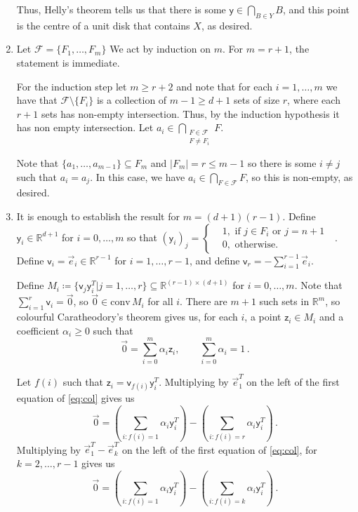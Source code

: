 \documentclass[kulak]{tplt}
\theoremstyle{definition}
\newcommand{\R}{\mathbb{R}}
\newcommand{\FF}{\mathcal F}
\newcommand{\vv}{\mathsf{v}}
\newcommand{\vy}{\mathsf{y}}
\newcommand{\vz}{\mathsf{z}}
\newcommand{\conv}{\mathrm{conv}}
\begin{document}
\begin{enumerate}
Thus, Helly's theorem tells us that there is some $\vy \in \bigcap_{B \in Y} B $, and this point is the centre of a unit disk that contains $X$, as desired.


\item 
Let $\FF = \{F_1, \ldots, F_m\} $
We act by induction on $m$.
For $m = r+1$, the statement is immediate.

For the induction step let $m \geq r+2$ and note that for each $i = 1, \ldots, m$ we have that $\FF \setminus  \{ F_i\} $ is a collection of $m-1\geq d+1$ sets of size $r$, where each $r+1$ sets has non-empty intersection.
Thus, by the induction hypothesis it has non empty intersection.
Let $a_i \in \bigcap_{\substack{ F \in \FF  \\ F \neq F_i }} F $.

Note that $\{a_1, \ldots, a_{m-1}\} \subseteq F_m$ and $|F_m| =r \leq m-1$ so there is some $i \neq j $ such that $a_i = a_j$.
In this case, we have $a_i \in \bigcap_{F \in \FF } F$, so this is non-empty, as desired.


\item 
It is enough to establish the result for $m = (d+1)(r-1)$.
Define $\vy_i \in \R^{d+1}$ for $i = 0, \ldots, m$ so that $(\vy_i)_j = \begin{cases}&1, \text{ if $j \in F_i$ or $j = n+1$ } \\  &0, \text{ otherwise.}\end{cases}$.
Define $\vv_i = \vec{e}_i \in\R^{r-1}$ for $i = 1, \ldots, r-1$, and define $\vv_r = - \sum_{i=1}^{r-1} \vec{e}_i$.

Define $M_i \coloneqq \{\vv_j\vy^T_i | j=1, \ldots, r \} \subseteq \R^{(r-1) \times (d+1)}$ for $i = 0, \ldots, m$.
Note that $\sum_{i=1}^r \vv_i = \vec{0}$, so $\vec{0} \in \conv \, M_i$ for all $i$.
There are $m+1$ such sets in $\R^m$, so colourful Caratheodory's theorem gives us, for each $i$, a point $\vz_i\in M_i$ and a coefficient $\alpha_i\geq 0$ such that 
\begin{equation}\label{eq:col}
 \vec{0} = \sum_{i=0}^m \alpha_i \vz_i , \quad \quad \sum_{i=0}^m \alpha_i = 1\, . 
\end{equation}

Let $f(i)$ such that $\vz_i = \vv_{f(i)}\vy_i^T$.
Multiplying by $\vec{e}_1^T$ on the left of the first equation of \eqref{eq:col} gives us 
$$ \vec{0} = \left( \sum_{i: f(i) = 1} \alpha_i \vy_i^T\right) - \left(\sum_{i: f(i) = r} \alpha_i \vy_i^T \right) \, . $$
Multiplying by $\vec{e}_1^T - \vec{e}_k^T$ on the left of the first equation of \eqref{eq:col}, for $k = 2, \ldots, r-1$ gives us 
$$ \vec{0} = \left( \sum_{i: f(i) = 1} \alpha_i \vy_i^T\right) - \left(\sum_{i: f(i) = k} \alpha_i \vy_i^T \right) \, . $$


\end{enumerate}
\end{document}
